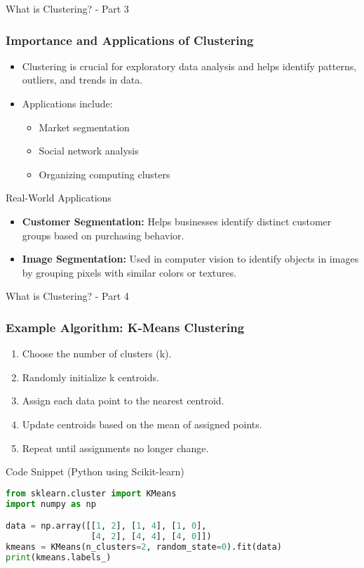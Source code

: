 \documentclass[aspectratio=169]{beamer}
\begin{document}
\begin{frame}[fragile]{What is Clustering? - Part 3}
    \frametitle{Importance and Applications of Clustering}
    \begin{itemize}
        \item Clustering is crucial for exploratory data analysis and helps identify patterns, outliers, and trends in data.
        \item Applications include:
        \begin{itemize}
            \item Market segmentation
            \item Social network analysis
            \item Organizing computing clusters
        \end{itemize}
    \end{itemize}
    
    \begin{block}{Real-World Applications}
        \begin{itemize}
            \item \textbf{Customer Segmentation:} Helps businesses identify distinct customer groups based on purchasing behavior.
            \item \textbf{Image Segmentation:} Used in computer vision to identify objects in images by grouping pixels with similar colors or textures.
        \end{itemize}
    \end{block}
\end{frame}

\begin{frame}[fragile]{What is Clustering? - Part 4}
    \frametitle{Example Algorithm: K-Means Clustering}
    \begin{enumerate}
        \item Choose the number of clusters (k).
        \item Randomly initialize k centroids.
        \item Assign each data point to the nearest centroid.
        \item Update centroids based on the mean of assigned points.
        \item Repeat until assignments no longer change.
    \end{enumerate}

    \begin{block}{Code Snippet (Python using Scikit-learn)}
    \begin{lstlisting}[language=Python]
from sklearn.cluster import KMeans
import numpy as np

data = np.array([[1, 2], [1, 4], [1, 0],
                 [4, 2], [4, 4], [4, 0]])
kmeans = KMeans(n_clusters=2, random_state=0).fit(data)
print(kmeans.labels_)
    \end{lstlisting}
    \end{block}
\end{frame}
\end{document}

